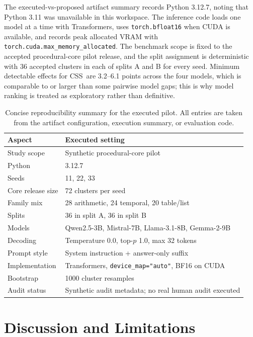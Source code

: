 \documentclass{article}
\newcommand{\css}{\textsc{CSS}}
\begin{document}
The executed-vs-proposed artifact summary records Python 3.12.7, noting that Python 3.11 was unavailable in this workspace. The inference code loads one model at a time with Transformers, uses \texttt{torch.bfloat16} when CUDA is available, and records peak allocated VRAM with \texttt{torch.cuda.max\_memory\_allocated}. The benchmark scope is fixed to the accepted procedural-core pilot release, and the split assignment is deterministic with 36 accepted clusters in each of splits A and B for every seed. Minimum detectable effects for \css\ are 3.2--6.1 points across the four models, which is comparable to or larger than some pairwise model gaps; this is why model ranking is treated as exploratory rather than definitive.

\begin{table}[t]
\caption{Concise reproducibility summary for the executed pilot. All entries are taken from the artifact configuration, execution summary, or evaluation code.}
\label{tab:repro}
\centering
\small
\begin{tabular}{ll}
\toprule
Aspect & Executed setting \\
\midrule
Study scope & Synthetic procedural-core pilot \\
Python & 3.12.7 \\
Seeds & 11, 22, 33 \\
Core release size & 72 clusters per seed \\
Family mix & 28 arithmetic, 24 temporal, 20 table/list \\
Splits & 36 in split A, 36 in split B \\
Models & Qwen2.5-3B, Mistral-7B, Llama-3.1-8B, Gemma-2-9B \\
Decoding & Temperature 0.0, top-$p$ 1.0, max 32 tokens \\
Prompt style & System instruction + answer-only suffix \\
Implementation & Transformers, \texttt{device\_map="auto"}, BF16 on CUDA \\
Bootstrap & 1000 cluster resamples \\
Audit status & Synthetic audit metadata; no real human audit executed \\
\bottomrule
\end{tabular}
\end{table}

\section{Discussion and Limitations}
\label{sec:discussion}
\end{document}
